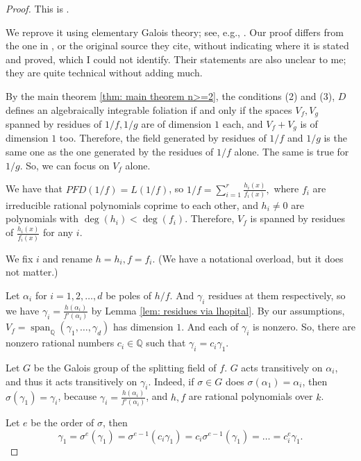\documentclass{amsart}
\newcommand{\op}{\operatorname}
\theoremstyle{definition}
\begin{document}
\begin{proof}
    This is {\cite[a comment at page 6 that is to follow from Proposition 7 therein]{rational_first_for_separated_2025}}.
    
    We reprove it using elementary Galois theory; see, e.g., \cite[Chapter 8]{Jacobson-BasicAlgebraII}. Our proof differs from the one in \cite{rational_first_for_separated_2025}, or the original source they cite, without indicating where it is stated and proved, which I could not identify. Their statements are also unclear to me; they are quite technical without adding much.

    By the main theorem \ref{thm: main theorem n>=2}, the conditions (2) and (3), $D$ defines an algebraically integrable foliation if and only if the spaces $V_f, V_g$ spanned by residues of $1/f,1/g$ are of dimension $1$ each, and $V_f+V_g$ is of dimension $1$ too. Therefore, the field generated by residues of $1/f$ and $1/g$ is the same one as the one generated by the residues of $1/f$ alone. The same is true for $1/g$. So, we can focus on $V_f$ alone.

    We have that $PFD(1/f)=L(1/f)$, so
    $
    1/f= \sum_{i=1}^r \frac{h_i(x)}{f_i(x)},
    $
    where $f_i$ are irreducible rational polynomials coprime to each other, and $h_i\ne 0$ are polynomials with $\op{deg}(h_i)<\op{deg}(f_i)$.
    Therefore, $V_f$ is spanned by residues of $\frac{h_i(x)}{f_i(x)}$ for any $i$.

    We fix $i$ and rename $h=h_i, f=f_i$. (We have a notational overload, but it does not matter.)
    
    Let $\alpha_i$ for $i=1,2,\ldots,d$ be poles of $h/f$. And $\gamma_i$ residues at them respectively, so  we have $\gamma_i=\frac{h(\alpha_i)}{f'(\alpha_i)}$ by Lemma \ref{lem: residues via lhopital}.
    By our assumptions, $V_f=\op{span}_\mathbb{Q}(\gamma_1,\ldots,\gamma_d)$ has dimension $1$. And each of $\gamma_i$ is nonzero. So, there are nonzero rational numbers $c_i \in \mathbb{Q}$ such that $\gamma_i=c_i\gamma_1$.
    
    Let $G$ be the Galois group of the splitting field of $f$. $G$ acts transitively on $\alpha_i$, and thus it acts transitively on $\gamma_i$.
    Indeed, if $\sigma\in G$ does $\sigma(\alpha_1)=\alpha_i$, then
    $\sigma(\gamma_1)=\gamma_i$, because $\gamma_i=\frac{h(\alpha_i)}{f'(\alpha_i)}$, and $h,f$ are rational polynomials over $k$.

    Let $e$ be the order of $\sigma$, then
    \begin{equation}\label{eq: argument from order at most 2}
        \gamma_1=\sigma^e (\gamma_1)=\sigma^{e-1}(c_i\gamma_1)=c_i\sigma^{e-1}(\gamma_1)=\ldots=c_i^e\gamma_1.
    \end{equation}


\end{proof}
\end{document}
